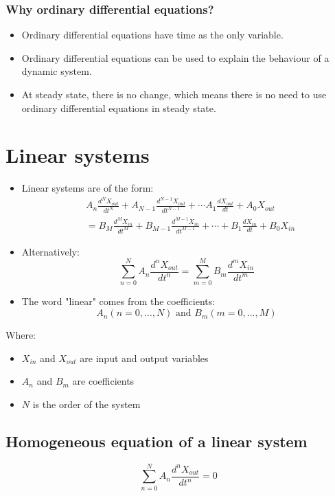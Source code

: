 \documentclass[11pt]{article}
\begin{document}
\subsubsection{Why ordinary differential equations?}
\label{sec:org005d275}
\begin{itemize}
\item Ordinary differential equations have time as the only variable.
\item Ordinary differential equations can be used to explain the behaviour of a dynamic system.
\item At steady state, there is no change, which means there is no need to use ordinary differential equations in steady state.
\end{itemize}

 \newpage
\section{Linear systems}
\label{sec:org3c6de48}
\begin{itemize}
\item Linear systems are of the form:
\begin{align*}
&A_n \frac{d^N X_{out}}{dt^N} + A_{N - 1} \frac{d^{N - 1} X_{out}}{dt^{N - 1}} + \cdots A_1 \frac{d X_{out}}{dt} + A_0 X_{out} \\
&= B_M \frac{d^M X_{in}}{dt^M} + B_{M - 1} \frac{d^{M - 1} X_{in}}{dt^{M - 1}} + \cdots + B_1 \frac{dX_{in}}{dt} + B_0 X_{in}
\end{align*}
\item Alternatively:
\[\sum_{n = 0}^N A_n \frac{d^n X_{out}}{dt^n} = \sum_{m = 0}^M B_m \frac{d^m X_{in}}{dt^m}\]
\item The word "linear" comes from the coefficients:
\[A_n (n = 0, \ldots, N) \text{ and } B_m (m = 0, \ldots, M)\]
\end{itemize}

Where:
\begin{itemize}
\item \(X_{in}\) and \(X_{out}\) are input and output variables
\item \(A_n\) and \(B_m\) are coefficients
\item \(N\) is the order of the system
\end{itemize}
\subsection{Homogeneous equation of a linear system}
\label{sec:org1ebbf16}
\[\sum_{n = 0}^N A_n \frac{d^n X_{out}}{dt^n} = 0\]
\end{document}

